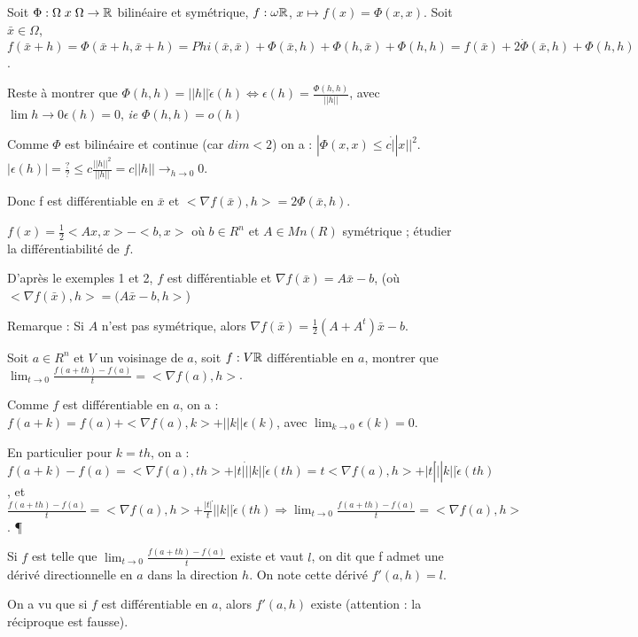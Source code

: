 		\begin{exemple}
		
		Soit $\Phi : \Omega \; x \; \Omega \rightarrow \mathbb{R}$ bilinéaire et symétrique, $f: \omega \mathbb{R}$, $x \mapsto f(x) = \Phi(x, x)$.
		Soit $\bar{x} \in \Omega$, $f(\bar{x}+h) = \Phi(\bar{x}+h, \bar{x}+h) = Phi(\bar{x}, \bar{x}) + \Phi(\bar{x}, h) + \Phi(h, \bar{x}) + \Phi(h, h) = f(\bar{x}) + 2 \dot \Phi(\bar{x}, h) + \Phi(h, h)$.
		
		Reste à montrer que $\Phi(h, h) = ||h|| \dot \epsilon (h) \Leftrightarrow \epsilon (h) = \frac{ \Phi(h, h) }{ ||h|| }$, avec $\lim{h \rightarrow 0} \epsilon (h) = 0$, \textit{ie} $\Phi(h, h) = o(h)$
		
		Comme $\Phi$ est bilinéaire et continue (car $dim < 2$) on a : $| \Phi (x, x) \leq c \dot ||x||^2$.
		$| \epsilon (h) | = \frac{ ? }{ ? } \leq c \frac{ ||h||^2 }{ ||h|| } = c ||h|| \rightarrow_{h \rightarrow 0} 0$. %
		
		Donc f est différentiable en $\bar{x}$ et $<\nabla f(\bar{x}), h> = 2 \Phi( \bar{x}, h)$.
		\end{exemple}
		
		\begin{exemple}
		
		$f(x) = \frac{1}{2} <Ax, x> - <b, x>$ où $b \in R^n$ et $A \in Mn(R)$ symétrique ; étudier la différentiabilité de $f$.
		
		D'après le exemples 1 et 2, $f$ est différentiable et $\nabla f(\bar{x}) = A \bar{x} - b$, (où $<\nabla f(\bar{x}), h> = (A \bar{x} -b, h>$)
		
		Remarque : Si $A$ n'est pas symétrique, alors $\nabla f(\bar{x}) = \frac{1}{2} (A+A^t) \bar{x} - b$.
		\end{exemple}
		
		\begin{exemple}
		
		Soit $a \in R^n$ et $V$ un voisinage de $a$, soit $f:V \mathbb{R}$ différentiable en $a$, montrer que $\lim_{t \rightarrow 0} \frac{ f(a+th) - f(a) }{ t } = <\nabla f(a), h>$.
		
		Comme $f$ est différentiable en $a$, on a : $f(a+k) = f(a) + <\nabla f(a), k> + ||k|| \epsilon (k)$, avec $\lim_{k \rightarrow 0} \epsilon (k) = 0$.
		
		En particulier pour $k=th$, on a : $f(a+k) - f(a) = <\nabla f(a), th> + |t| \dot ||k|| \dot \epsilon (th) =  t <\nabla f(a), h> + |t| \dot ||k|| \dot \epsilon (th)$, et $\frac{ f(a+th) - f(a) }{ t } = <\nabla f(a), h> + \frac{|t|}{t} \dot ||k|| \dot \epsilon (th) \Rightarrow \lim_{t \rightarrow 0} \frac{ f(a+th) - f(a) }{ t } = < \nabla f(a), h>$. \P
		
		Si $f$ est telle que $\lim_{t \rightarrow 0} \frac{ f(a+th)-f(a) }{t}$ existe et vaut $l$, on dit que f admet une dérivé directionnelle en $a$ dans la direction $h$. On note cette dérivé $f'(a, h) = l$.
		
		On a vu que si $f$ est différentiable en $a$, alors $f'(a, h)$ existe (attention : la réciproque est fausse).
		\end{exemple}
		
